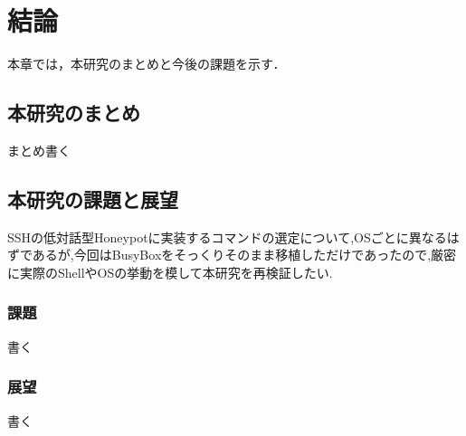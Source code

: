 \chapter{結論}
\label{conc}

本章では，本研究のまとめと今後の課題を示す．

\section{本研究のまとめ}

まとめ書く

\section{本研究の課題と展望}
SSHの低対話型Honeypotに実装するコマンドの選定について,OSごとに異なるはずであるが,今回はBusyBoxをそっくりそのまま移植しただけであったので,厳密に実際のShellやOSの挙動を模して本研究を再検証したい.

\subsection{課題}

書く

\subsection{展望}

書く

